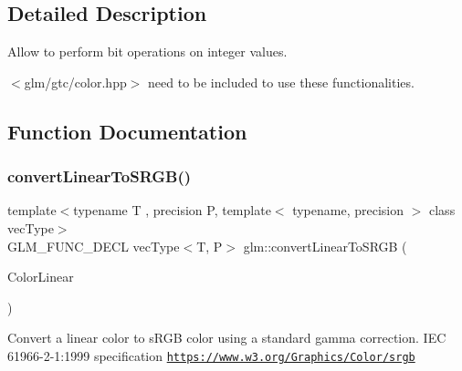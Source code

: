 \subsection{Detailed Description}
Allow to perform bit operations on integer values. 

$<$glm/gtc/color.\+hpp$>$ need to be included to use these functionalities. 

\subsection{Function Documentation}
\mbox{\label{group__gtc__color__space_gad813dcd99644cafc775e83d6504ccb93}} 
\subsubsection{\texorpdfstring{convert\+Linear\+To\+S\+R\+G\+B()}{convertLinearToSRGB()}\hspace{0.1cm}{\footnotesize\ttfamily [1/2]}}
{\footnotesize\ttfamily template$<$typename T , precision P, template$<$ typename, precision $>$ class vec\+Type$>$ \\
G\+L\+M\+\_\+\+F\+U\+N\+C\+\_\+\+D\+E\+CL vec\+Type$<$T, P$>$ glm\+::convert\+Linear\+To\+S\+R\+GB (\begin{DoxyParamCaption}\item[{vec\+Type$<$ T, P $>$ const \&}]{Color\+Linear }\end{DoxyParamCaption})}

Convert a linear color to s\+R\+GB color using a standard gamma correction. I\+EC 61966-\/2-\/1\+:1999 specification \href{https://www.w3.org/Graphics/Color/srgb}{\tt https\+://www.\+w3.\+org/\+Graphics/\+Color/srgb} \mbox{\label{group__gtc__color__space_ga63f8b003da7acf44370eb47bfb8b3d42}} 
